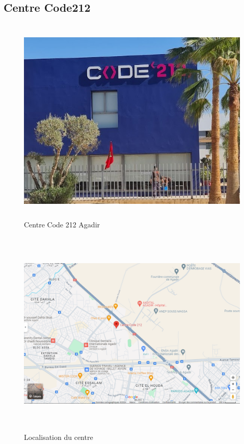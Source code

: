 \documentclass[a4paper, 11pt, openany]{report}
\begin{document}
\subsection{Centre Code212}
\begin{figure}[H]
\centering
\includegraphics[height=10cm , width=\textwidth]{assets/images/code.jpg}
\caption{Centre Code 212 Agadir}
\label{fig:imagecentre}
\end{figure}

\begin{figure}[H]
\centering
\includegraphics[height=10cm , width=\textwidth]{assets/images/maps.png}
\caption{Localisation du centre}
\label{fig:localisationcentre}
\end{figure}
\end{document}
